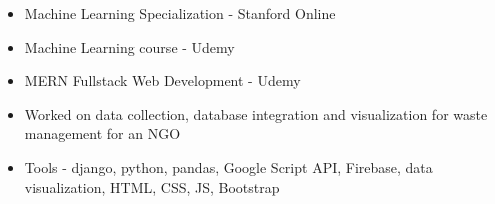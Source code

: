 
%
%
%
%



{}




\begin{itemize}
\item{Machine Learning Specialization - Stanford Online}
\item{Machine Learning course - Udemy}
\item{MERN Fullstack Web Development - Udemy} 
\end{itemize}



\begin{itemize}
\item Worked on data collection, database integration and visualization for waste management for an NGO
\item Tools - django, python, pandas, Google Script API, Firebase, data visualization, HTML, CSS, JS, Bootstrap
\end{itemize}
\divider

